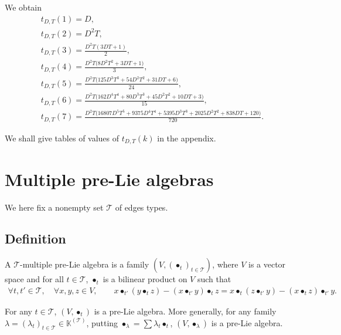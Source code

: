\documentclass[10pt,a4paper]{amsart}
\numberwithin{equation}{section}
\newcommand{\K}{\mathbb{K}}
\newcommand{\T}{\mathcal{T}}
\begin{document}
\begin{Example}
We obtain
\begin{gather*}
t_{D,T}(1)=D,\\[.1ex]
t_{D,T}(2)=D^2T,\\[.1ex]
t_{D,T}(3)=\frac{D^2T(3DT+1)}{2},\\[.1ex]
t_{D,T}(4)=\frac{D^2T\big(8D^2T^2+3DT+1\big)}{3},\\[.1ex]
t_{D,T}(5)=\frac{D^2T\big(125D^3T^3+54D^2T^2+31DT+6\big)}{24},\\[.1ex]
t_{D,T}(6)=\frac{D^2T\big(162D^4T^4+80D^3T^3+45D^2T^2+10DT+3\big)}{15},\\[.1ex]
t_{D,T}(7)=\frac{D^2T\big(16807D^5T^5+9375D^4T^4+5395D^3T^3+2025D^2T^2+838DT+120\big)}{720}.
\end{gather*}
\end{Example}

We shall give tables of values of $t_{D,T}(k)$ in the appendix.

\section{Multiple pre-Lie algebras}

We here fix a nonempty set $\T$ of edges types.

\subsection{Definition}

\begin{Definition} \label{defi3}
A $\T$-multiple pre-Lie algebra is a family $(V,(\bullet_t)_{t\in \T})$,
where $V$ is a vector space and for all $t\in \T$,
$\bullet_t$ is a bilinear product on $V$ such that
\begin{gather*}
\forall t,t'\in \T,\quad\forall x,y,z\in V,\qquad
x\bullet_{t'}(y \bullet_t z)-(x\bullet_{t'} y)\bullet_t z=x\bullet_t(z \bullet_{t'} y)-(x\bullet_t z)\bullet_{t'} y.
\end{gather*}
\end{Definition}

\begin{Remark}
For any $t\in \T$, $(V,\bullet_t)$ is a pre-Lie algebra.
More generally, for any family $\lambda=(\lambda_t)_{t\in \T}\in \K^{(\T)}$,
putting $\bullet_\lambda=\sum \lambda_t \bullet_t$, $(V,\bullet_\lambda)$ is a pre-Lie algebra.
\end{Remark}
\end{document}
